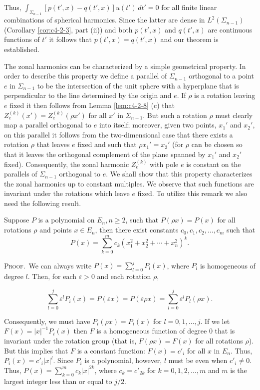 Thus, $\int_{\Sigma_{n-1}} [p(t', x) - q(t', x)] u(t') \, dt' = 0$ for all finite linear combinations of spherical harmonics. Since the latter are dense in $L^2(\Sigma_{n-1})$ (Corollary \ref{cor:c4-2-3}, part (ii)) and both $p(t', x)$ and $q(t', x)$ are continuous functions of $t'$ it follows that $p(t', x) = q(t', x)$ and our theorem is established.

The zonal harmonics can be characterized by a simple geometrical property. In order to describe this property we define a parallel of $\Sigma_{n-1}$ orthogonal to a point $e$ in $\Sigma_{n-1}$ to be the intersection of the unit sphere with a hyperplane that is perpendicular to the line determined by the origin and $e$. If $\rho$ is a rotation leaving $e$ fixed it then follows from Lemma \ref{lem:c4-2-8} (c) that $Z_e^{(k)}(x') = Z_e^{(k)}(\rho x')$ for all $x'$ in $\Sigma_{n-1}$. But such a rotation $\rho$ must clearly map a parallel orthogonal to $e$ into itself; moreover, given two points, $x_1'$ and $x_2'$, on this parallel it follows from the two-dimensional case that there exists a rotation $\rho$ that leaves $e$ fixed and such that $\rho x_1' = x_2'$ (for $\rho$ can be chosen so that it leaves the orthogonal complement of the plane spanned by $x_1'$ and $x_2'$ fixed). Consequently, the zonal harmonic $Z_e^{(k)}$ with pole $e$ is constant on the parallels of $\Sigma_{n-1}$ orthogonal to $e$. We shall show that this property characterizes the zonal harmonics up to constant multiples. We observe that such functions are invariant under the rotations which leave $e$ fixed. To utilize this remark we also need the following result.

\begin{lemma}
\label{lem:c4-2-11}
Suppose $P$ is a polynomial on $E_n, n \geq 2$, such that $P(\rho x) = P(x)$ for all rotations $\rho$ and points $x \in E_n$, then there exist constants $c_0, c_1, c_2, \ldots, c_m$ such that
\[
P(x)=\sum_{k=0}^{m}c_{k}(x_{1}^{2}+x_{2}^{2}+\cdots+x_{n}^{2})^{k}.
\]

\end{lemma}

\textsc{Proof.}\ We can always write $P(x) = \sum_{l=0}^{j} P_l(x)$, where $P_l$ is homogeneous of degree $l$. Then, for each $\varepsilon > 0$ and each rotation $\rho$,

\[
\sum_{l=0}^{j}\varepsilon^{l}P_{i}(x)=P(\varepsilon x)=P(\varepsilon\rho x)=\sum_{l=0}^{j}\varepsilon^{l}P_{l}(\rho x).
\]

Consequently, we must have $P_i(\rho x) = P_i(x)$ for $l = 0, 1, \ldots, j$. If we let $F(x) = |x|^{-1}P_i(x)$ then $F$ is a homogeneous function of degree 0 that is invariant under the rotation group (that is, $F(\rho x) = F(x)$ for all rotations $\rho$). But this implies that $F$ is a constant function: $F(x) = c'_i$ for all $x$ in $E_n$. Thus, $P_i(x) = c'_i|x|^l$. Since $P_i$ is a polynomial, however, $l$ must be even when $c'_i \neq 0$. Thus, $P(x) = \sum_{k=0}^{m} c_k|x|^{2k}$, where $c_k = c'_{2k}$ for $k = 0, 1, 2, \ldots, m$ and $m$ is the largest integer less than or equal to $j/2$.

